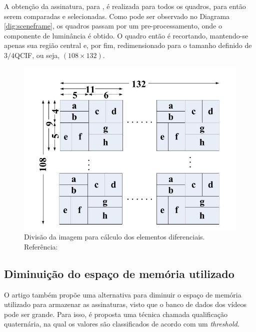 A obtenção da assinatura, para \citeauthor{mao2015sceneframe}, é realizada para todos os quadros, para então serem comparadas e selecionadas. Como pode ser observado no Diagrama \ref{dig:sceneframe}, os quadros passam por um pre-processamento, onde o componente de luminância é obtido. O quadro então é recortando, mantendo-se apenas sua região central e, por fim, redimensionado para o tamanho definido de $3/4$QCIF, ou seja, $(108\times132)$.


\begin{figure}[h]
  \centering
    \includegraphics[width=\textwidth]{dados/figuras/sf_division.png}
    \caption{Divisão da imagem para cálculo dos elementos diferenciais. Referência: \citeauthor{mao2015sceneframe}}
    \label{fig:divsceneframe}
\end{figure}

\subsection{Diminuição do espaço de memória utilizado}

O artigo também propõe uma alternativa para diminuir o espaço de memória utilizado para armazenar as assinaturas, visto que o banco de dados dos vídeos pode ser grande. Para isso, é proposta uma técnica chamada qualificação quaternária, na qual os valores são classificados de acordo com um \textit{threshold}.


%
%
